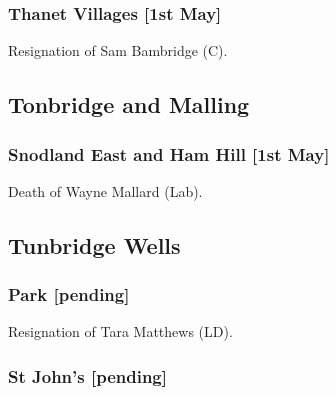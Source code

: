 \documentclass[a4paper,openany]{book}
\begin{document}
\begin{resultsiii}
\subsubsection*{Thanet Villages \hspace*{\fill}\nolinebreak[1]%
	\enspace\hspace*{\fill}
	[1st May]}


Resignation of Sam Bambridge (C).

\subsection*{Tonbridge and Malling}

\subsubsection*{Snodland East and Ham Hill \hspace*{\fill}\nolinebreak[1]%
	\enspace\hspace*{\fill}
	[1st May]}


Death of Wayne Mallard (Lab).

\subsection*{Tunbridge Wells}

\subsubsection*{Park \hspace*{\fill}\nolinebreak[1]%
	\enspace\hspace*{\fill}
	[pending]}


Resignation of Tara Matthews (LD).

\subsubsection*{St John's \hspace*{\fill}\nolinebreak[1]%
	\enspace\hspace*{\fill}
	[pending]}


\end{resultsiii}
\end{document}
